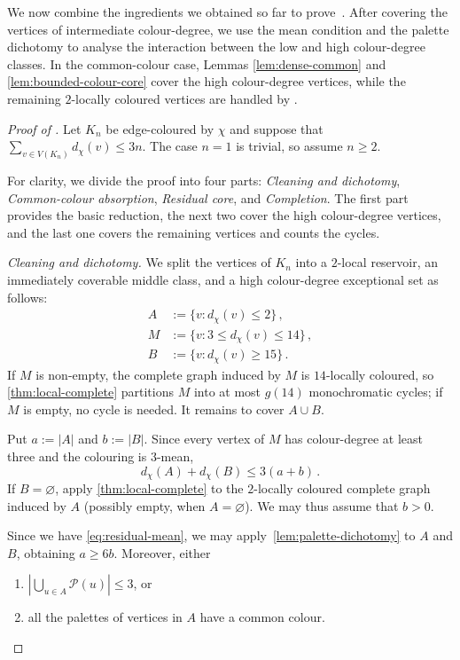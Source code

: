 \documentclass[a4paper,12pt,reqno]{amsart}
\newcommand{\cP}{\mathcal P}
\newcommand{\dd}{d_{\chi}}
\begin{document}
We now combine the ingredients we obtained so far to prove~. After covering the vertices of intermediate colour-degree, we use the mean condition and the palette dichotomy to analyse the interaction between the low and high colour-degree classes. In the common-colour case, Lemmas \ref{lem:dense-common} and \ref{lem:bounded-colour-core} cover the high colour-degree
vertices, while the remaining $2$-locally coloured vertices are handled by
.

\begin{proof}[Proof of ]
Let $K_n$ be edge-coloured by $\chi$ and suppose that $\sum_{v\in V(K_n)}\dd(v)\le3n$. The case $n=1$ is trivial, so assume $n\ge2$.

For clarity, we divide the proof into four parts: \emph{Cleaning and
dichotomy}, \emph{Common-colour absorption}, \emph{Residual core}, and
\emph{Completion}. The first part provides
the basic reduction, the next two cover the high colour-degree vertices, and the
last one covers the remaining vertices and counts the cycles.

\medskip
\noindent\emph{Cleaning and dichotomy.} We split the vertices of $K_n$ into a
$2$-local reservoir, an immediately coverable middle class, and a high
colour-degree exceptional set as follows:
\begin{align*}
  A&:=\{v\colon\dd(v)\le2\}\,,\\
  M&:=\{v\colon3\le\dd(v)\le14\}\,,\\
  B&:=\{v\colon\dd(v)\ge15\}\,.
\end{align*}
If $M$ is non-empty, the complete graph induced by $M$ is $14$-locally
coloured, so \cref{thm:local-complete} partitions $M$ into at most $g(14)$
monochromatic cycles; if $M$ is empty, no cycle is needed.  It remains to
cover $A\cup B$.

Put $a:=|A|$ and $b:=|B|$.  Since every vertex of $M$ has colour-degree at
least three and the colouring is $3$-mean,
\begin{equation}\label{eq:residual-mean}
  \dd(A)+\dd(B)
  \le 3(a+b)\,.
\end{equation}
If $B=\varnothing$, apply \cref{thm:local-complete} to the $2$-locally coloured
complete graph induced by $A$ (possibly empty, when $A=\varnothing$).  We may
thus assume that $b>0$.

Since we have \eqref{eq:residual-mean}, we may
apply~\cref{lem:palette-dichotomy} to $A$ and $B$, obtaining $a\ge6b$.
Moreover, either 
\begin{enumerate}
\item $|\bigcup_{u\in A}\cP(u)|\le3$, or
\item all the palettes of vertices in $A$ have a common colour.
\end{enumerate}


\end{proof}
\end{document}
